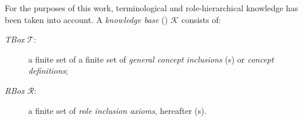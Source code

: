   For the purposes of this work, terminological and role-hierarchical knowledge has been taken into account.
  A \emph{knowledge base} (\kb) \(\mathcal{K}\) consists of:
  \begin{description}
    \item[\emph{TBox} \(\mathcal{T}\):] a finite set of a finite set of \emph{general concept inclusions} (\gci{}s) or \emph{concept definitions};
    \item[\emph{RBox} \(\mathcal{R}\):] a finite set of \emph{role inclusion axioms}, hereafter (\ria{}s).
  \end{description}

